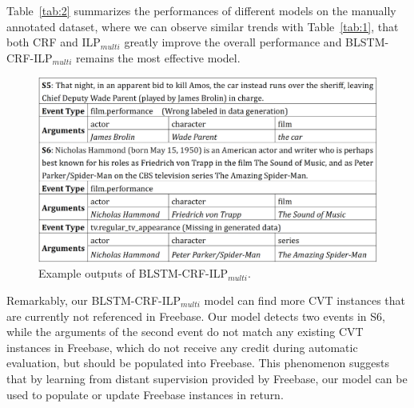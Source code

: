 Table~\ref{tab:2} summarizes the performances of different models on the manually annotated dataset, where we can observe similar trends with Table~\ref{tab:1}, that 
both CRF and ILP$_{multi}$ greatly improve the overall performance and 
BLSTM-CRF-ILP$_{multi}$ remains the most effective model. %

\begin{figure}[h]
	\centering
	\includegraphics[width=.48\textwidth]{figure3.png}
	\caption{Example outputs of BLSTM-CRF-ILP$_{multi}$.\label{fig:1}}
\end{figure}




Remarkably, our BLSTM-CRF-ILP$_{multi}$ model can find more CVT instances that are currently not referenced in Freebase. Our model detects two events in S6, while the arguments of the second event do not match any existing CVT instances in Freebase, which do not receive any credit during automatic evaluation, but should be populated into Freebase. %
This phenomenon suggests that by learning from distant supervision provided by Freebase, our model can be used to populate or update Freebase instances in return.

